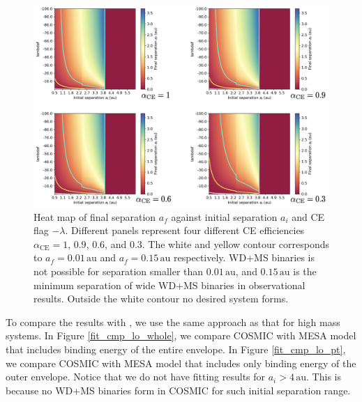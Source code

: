 \documentclass[12pt]{article}
\newcommand{\alphace}{\alpha_{\mathrm{CE}}}
\newcommand{\au}{\, \mathrm{au}}
\begin{document}
\begin{figure}
  \centering
  \includegraphics[width=\linewidth]{fig/1.5+0.8results.png}
  \caption{Heat map of final separation $a_f$ against initial separation $a_i$ and CE flag $-\lambda$. Different panels represent four different CE efficiencies $\alphace = 1$, $0.9$, $0.6$, and $0.3$. The white and yellow contour corresponds to $a_f = 0.01 \au$ and $a_f = 0.15 \au$ respectively. WD+MS binaries is not possible for separation smaller than $0.01 \au$, and $0.15 \au$ is the minimum separation of wide WD+MS binaries in observational results. Outside the white contour no desired system forms.}
  \label{res_lo}
\end{figure}

To compare the results with \cite{yamaguchi_lo}, we use the same approach as that for high mass systems. In Figure \ref{fit_cmp_lo_whole}, we compare COSMIC with MESA model that includes binding energy of the entire envelope. In Figure \ref{fit_cmp_lo_pt}, we compare COSMIC with MESA model that includes only binding energy of the outer envelope. Notice that we do not have fitting results for $a_i > 4 \au$. This is because no WD+MS binaries form in COSMIC for such initial separation range.
\end{document}
